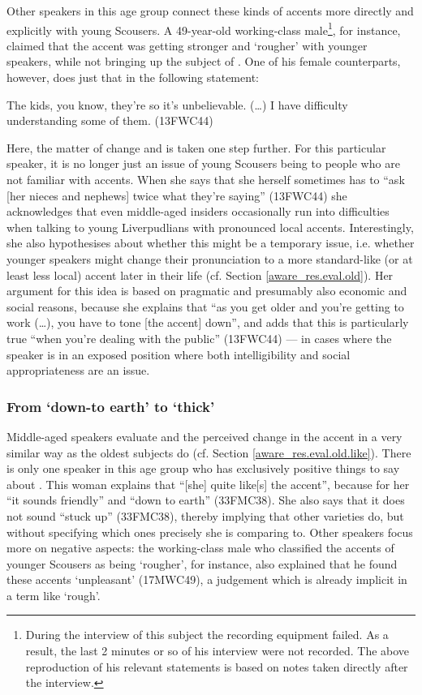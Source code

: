 Other speakers in this age group connect these kinds of accents more directly and explicitly with young Scousers.
A 49-year-old working-class male\footnote{During the interview of this subject the recording equipment failed. As a result, the last 2 minutes or so of his interview were not recorded. The above reproduction of his relevant statements is based on notes taken directly after the interview.}, for instance, claimed that the accent was getting stronger and `rougher' with younger speakers, while not bringing up the subject of .
One of his female counterparts, however, does just that in the following statement:
\begin{example}
	The kids, you know, they're so  it's unbelievable. (\ldots) I have difficulty understanding some of them. (13FWC44)
\end{example}
Here, the matter of change and  is taken one step further.
For this particular speaker, it is no longer just an issue of young Scousers being  to people who are not familiar with  accents.
When she says that she herself sometimes has to ``ask [her nieces and nephews] twice what they're saying'' (13FWC44) she acknowledges that even middle-aged insiders occasionally run into difficulties when talking to young Liverpudlians with pronounced local accents.
Interestingly, she also hypothesises about whether this might be a temporary issue, i.e. whether younger speakers might change their pronunciation to a more standard-like (or at least less local) accent later in their life (cf. Section \ref{aware_res.eval.old}).
Her argument for this idea is based on pragmatic and presumably also economic and social reasons, because she explains that ``as you get older and you're getting to work (\ldots), you have to tone [the accent] down'', and adds that this is particularly true ``when you're dealing with the public'' (13FWC44) --- in cases where the speaker is in an exposed position where both intelligibility and social appropriateness are an issue.

\subsubsection{From `down-to earth' to `thick'}
\label{aware_res.eval.mid.like}

Middle-aged speakers evaluate  and the perceived change in the accent in a very similar way as the oldest subjects do (cf. Section \ref{aware_res.eval.old.like}).
There is only one speaker in this age group who has exclusively positive things to say about .
This woman explains that ``[she] quite like[s] the accent'', because for her ``it sounds friendly'' and ``down to earth'' (33FMC38).
She also says that it does not sound ``stuck up'' (33FMC38), thereby implying that other varieties do, but without specifying which ones precisely she is comparing  to.
Other speakers focus more on negative aspects: the working-class male who classified the accents of younger Scousers as being `rougher', for instance, also explained that he found these accents `unpleasant' (17MWC49), a judgement which is already implicit in a term like `rough'.

